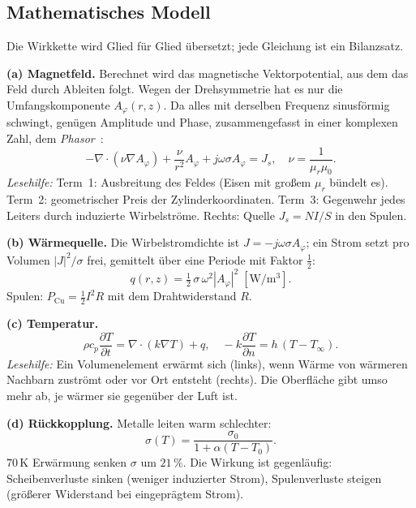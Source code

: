 \documentclass[a4paper, 10pt, conference]{ieeeconf}
\theoremstyle{remark}
\begin{document}
\subsection{Mathematisches Modell}
\label{sec:math}

Die Wirkkette wird Glied für Glied übersetzt; jede Gleichung ist ein
Bilanzsatz.

\textbf{(a) Magnetfeld.} Berechnet wird das magnetische Vektorpotential,
aus dem das Feld durch Ableiten folgt. Wegen der Drehsymmetrie hat es nur
die Umfangskomponente $A_\varphi(r,z)$. Da alles mit derselben Frequenz
sinusförmig schwingt, genügen Amplitude und Phase, zusammengefasst in
einer komplexen Zahl, dem \emph{Phasor}~\cite{biro1989vectorpotential}:
\begin{equation}
  -\nabla\!\cdot(\nu\nabla A_\varphi) + \frac{\nu}{r^2}A_\varphi
  + j\omega\sigma A_\varphi = J_s,\quad \nu=\frac{1}{\mu_r\mu_0}.
  \label{eq:em}
\end{equation}
\emph{Lesehilfe:} Term~1: Ausbreitung des Feldes (Eisen mit großem $\mu_r$
bündelt es). Term~2: geometrischer Preis der Zylinderkoordinaten. Term~3:
Gegenwehr jedes Leiters durch induzierte Wirbelströme. Rechts: Quelle
$J_s=NI/S$ in den Spulen.

\textbf{(b) Wärmequelle.} Die Wirbelstromdichte ist $J=-j\omega\sigma
A_\varphi$; ein Strom setzt pro Volumen $|J|^2/\sigma$ frei, gemittelt über
eine Periode mit Faktor $\tfrac12$:
\begin{equation}
  q(r,z)=\tfrac12\,\sigma\,\omega^2|A_\varphi|^2\;[\mathrm{W/m^3}].
  \label{eq:q}
\end{equation}
Spulen: $P_{\mathrm{Cu}}=\tfrac12I^2R$ mit dem Drahtwiderstand $R$.

\textbf{(c) Temperatur.}
\begin{equation}
  \rho c_p\frac{\partial T}{\partial t}=\nabla\!\cdot(k\nabla T)+q,\quad
  -k\frac{\partial T}{\partial n}=h\,(T-T_\infty).
  \label{eq:heat}
\end{equation}
\emph{Lesehilfe:} Ein Volumenelement erwärmt sich (links), wenn Wärme von
wärmeren Nachbarn zuströmt oder vor Ort entsteht (rechts). Die Oberfläche
gibt umso mehr ab, je wärmer sie gegenüber der Luft ist.

\textbf{(d) Rückkopplung.} Metalle leiten warm schlechter:
\begin{equation}
  \sigma(T)=\frac{\sigma_0}{1+\alpha(T-T_0)} .
  \label{eq:sigmaT}
\end{equation}
$70\,$K Erwärmung senken $\sigma$ um $21\,\%$. Die Wirkung ist
gegenläufig: Scheibenverluste sinken (weniger induzierter Strom),
Spulenverluste steigen (größerer Widerstand bei eingeprägtem Strom).
\end{document}
